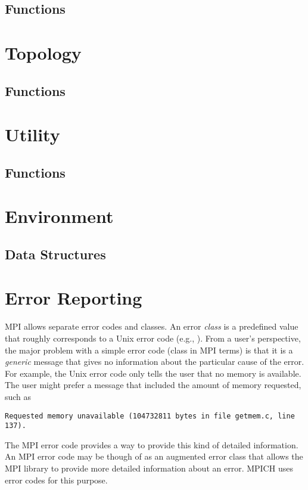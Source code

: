 \documentclass{article}
\begin{document}
\subsection{Functions}


\section{Topology}

\subsection{Functions}


\section{Utility}
\subsection{Functions}

 

\section{Environment}
\subsection{Data Structures}

%

\section{Error Reporting}
MPI allows separate error codes and classes.  An error \emph{class} is
a predefined value that roughly corresponds to a Unix error code
(e.g., ).  From a user's perspective, the major problem
with a simple error code (class in MPI terms) is that it is a
\emph{generic} message that gives no information about the particular
cause of the error.  For example, the Unix error code 
only tells the user that no memory is available.  The user might
prefer a message that included the amount of memory requested, such as 
\begin{verbatim}
Requested memory unavailable (104732811 bytes in file getmem.c, line 137).
\end{verbatim}
The MPI error code provides a way to provide this kind of detailed
information.  An MPI error code may be though of as an
augmented error class that allows the MPI library to provide more
detailed information about an error.  MPICH uses error codes for this
purpose.  
\end{document}
